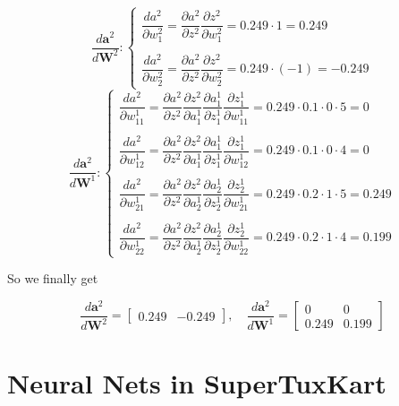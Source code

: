 \documentclass{article}
\begin{document}
		\newpage        
		\[
  			\dfrac{d\boldsymbol{a}^2}{d\boldsymbol{W}^2}:
  			\begin{cases}
               \dfrac{da^2}{\partial{w^2_{1}}}=\dfrac{\partial a^2}{\partial{z^2}}\dfrac{\partial z^2}{\partial{w^2_1}}=0.249\cdot1=0.249\\\\
               \dfrac{da^2}{\partial{w^2_{2}}}=\dfrac{\partial a^2}{\partial{z^2}}\dfrac{\partial z^2}{\partial{w^2_2}}=0.249\cdot(-1)=-0.249
            \end{cases}
		\]
		$$$$
		\[
  			\dfrac{d\boldsymbol{a}^2}{d\boldsymbol{W}^1}:
  			\begin{cases}
               \dfrac{da^2}{\partial{w^1_{11}}}=\dfrac{\partial a^2}{\partial{z^2}}\dfrac{\partial z^2}{\partial{a^1_1}}\dfrac{\partial a^1_1}{\partial{z^1_1}}\dfrac{\partial z^1_1}{\partial{w^1_{11}}}=0.249\cdot0.1\cdot0\cdot5=0\\\\
               \dfrac{da^2}{\partial{w^1_{12}}}=\dfrac{\partial a^2}{\partial{z^2}}\dfrac{\partial z^2}{\partial{a^1_1}}\dfrac{\partial a^1_1}{\partial{z^1_1}}\dfrac{\partial z^1_1}{\partial{w^1_{12}}}=0.249\cdot0.1\cdot0\cdot4=0\\\\
               \dfrac{da^2}{\partial{w^1_{21}}}=\dfrac{\partial a^2}{\partial{z^2}}\dfrac{\partial z^2}{\partial{a^1_2}}\dfrac{\partial a^1_2}{\partial{z^1_2}}\dfrac{\partial z^1_2}{\partial{w^1_{21}}}=0.249\cdot0.2\cdot1\cdot5=0.249\\\\
               \dfrac{da^2}{\partial{w^1_{22}}}=\dfrac{\partial a^2}{\partial{z^2}}\dfrac{\partial z^2}{\partial{a^1_2}}\dfrac{\partial a^1_2}{\partial{z^1_2}}\dfrac{\partial z^1_2}{\partial{w^1_{22}}}=0.249\cdot0.2\cdot1\cdot4=0.199
            \end{cases}
		\]
		
    	So we finally get
    	
    	$$\dfrac{d\boldsymbol{a}^2}{d\boldsymbol{W}^2}=\begin{bmatrix}0.249 & -0.249\end{bmatrix},\quad \dfrac{d\boldsymbol{a}^2}{d\boldsymbol{W}^1}=\begin{bmatrix}0 & 0\\0.249 & 0.199\end{bmatrix}$$
    	$$$$
			
        
    \section{Neural Nets in SuperTuxKart}
       
\end{document}
